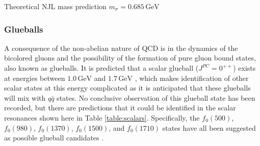 \documentclass[aps,prd,onecolumn,showpacs,amsmath,amssymb,nofootinbib, 11pt]{revtex4} \pdfoutput=1
\newcommand{\gev}{\mathrm{GeV}}
\begin{document}
Theoretical NJL mass prediction \cite{Schumacher2011} $m_{\sigma} = 0.685\,\gev$
\subsubsection{Glueballs}
A consequence of the non-abelian nature of QCD is in the dynamics of the bicolored gluons and the possibility of the formation of pure gluon bound states, also known as glueballs. It is predicted that  a scalar glueball ($J^{PC} = 0^{++}$) exists at energies between $1.0\,\gev$ and $1.7\,\gev$ \cite{Ochs2013}, which makes identification of other scalar states at this energy complicated as it is anticipated that these glueballs will mix with $q\bar q$ states. No conclusive observation of this glueball state has been recorded, but there are predictions that it could be identified in the scalar resonances shown here in Table \ref{table:scalars}. Specifically, the $f_0(500)$, $f_0(980)$, $f_0(1370)$, $f_0(1500)$, and $f_0(1710)$ states have all been suggested as possible glueball candidates \cite{Ochs2013}. 
\end{document}
